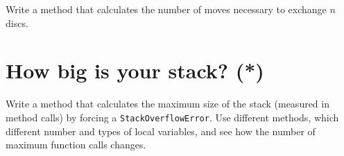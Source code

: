 \documentclass{article}
\begin{document}
Write a method that calculates the number of moves necessary to
exchange $n$ discs. 

\section{How big is your stack? (*)}
\label{sec:how-big-your}

Write a method that calculates the maximum size of the stack (measured
in method calls) by forcing a \verb+StackOverflowError+. Use different
methods, which different number and types of local variables, and see
how the number of maximum function calls changes.

\end{document}
